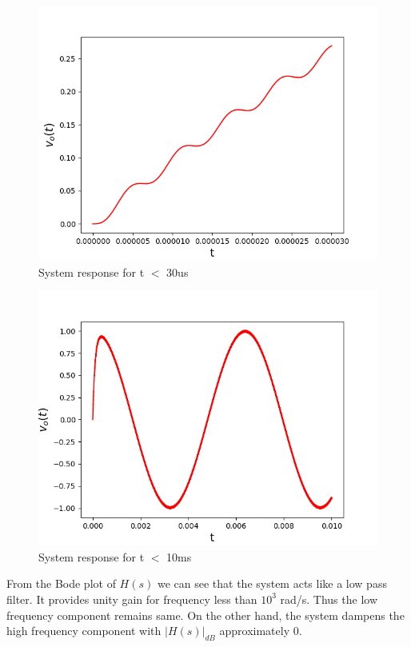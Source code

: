 \documentclass{article}
\begin{document}
\begin{figure}[h!]
\includegraphics[scale=0.6]{fig5.png}
\centering
\caption{System response for t $<$ 30us}
\label{fig:Coupled Oscillations}
\end{figure}
\begin{figure}[h!]
\includegraphics[scale=0.6]{fig6.png}
\centering
\caption{System response for t $<$ 10ms}
\label{fig:Coupled Oscillations}
\end{figure}

From the Bode plot of $H(s)$ we can see that the system acts like a low pass filter. It provides unity gain for frequency less than $10^3$ rad/s. Thus the low frequency component remains same. On the other hand, the system dampens the high frequency component with $|H(s)|_{dB}$ approximately 0.
\clearpage
\end{document}
